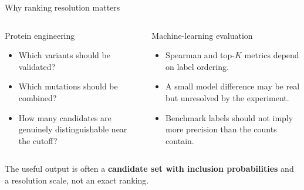 \documentclass[aspectratio=169,11pt]{beamer}
\newcommand{\tightitems}{\setlength{\itemsep}{0.35em}\setlength{\parskip}{0pt}}
\begin{document}
\begin{frame}{Why ranking resolution matters}
  \small
  \begin{columns}[T,onlytextwidth]
      \begin{block}{Protein engineering}
        \begin{itemize}\tightitems
          \item Which variants should be validated?
          \item Which mutations should be combined?
          \item How many candidates are genuinely distinguishable near the cutoff?
        \end{itemize}
      \end{block}

      \begin{block}{Machine-learning evaluation}
        \begin{itemize}\tightitems
          \item Spearman and top-$K$ metrics depend on label ordering.
          \item A small model difference may be real but unresolved by the experiment.
          \item Benchmark labels should not imply more precision than the counts contain.
        \end{itemize}
      \end{block}
  \end{columns}

  \begin{callout}
    The useful output is often a \textbf{candidate set with inclusion probabilities} and a resolution scale, not an exact ranking.
  \end{callout}
\end{frame}
\end{document}
